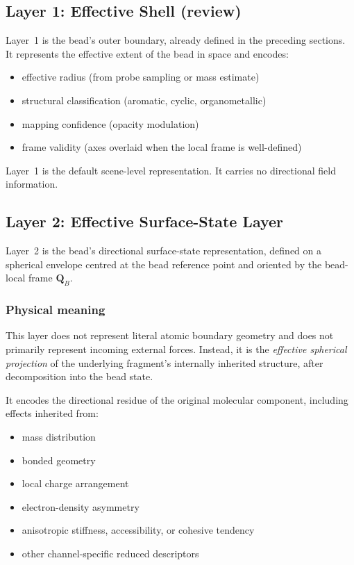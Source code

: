 \documentclass[11pt]{article}
\begin{document}
\subsection{Layer 1: Effective Shell (review)}

Layer~1 is the bead's outer boundary, already defined in the preceding
sections.  It represents the effective extent of the bead in space and
encodes:
\begin{itemize}
    \item effective radius (from probe sampling or mass estimate)
    \item structural classification (aromatic, cyclic, organometallic)
    \item mapping confidence (opacity modulation)
    \item frame validity (axes overlaid when the local frame is well-defined)
\end{itemize}

Layer~1 is the default scene-level representation.  It carries no
directional field information.

\subsection{Layer 2: Effective Surface-State Layer}

Layer~2 is the bead's directional surface-state representation, defined on
a spherical envelope centred at the bead reference point and oriented by the
bead-local frame $\mathbf{Q}_B$.

\subsubsection{Physical meaning}

This layer does not represent literal atomic boundary geometry and does not
primarily represent incoming external forces.  Instead, it is the
\emph{effective spherical projection} of the underlying fragment's
internally inherited structure, after decomposition into the bead state.

It encodes the directional residue of the original molecular component,
including effects inherited from:
\begin{itemize}
    \item mass distribution
    \item bonded geometry
    \item local charge arrangement
    \item electron-density asymmetry
    \item anisotropic stiffness, accessibility, or cohesive tendency
    \item other channel-specific reduced descriptors
\end{itemize}
\end{document}
